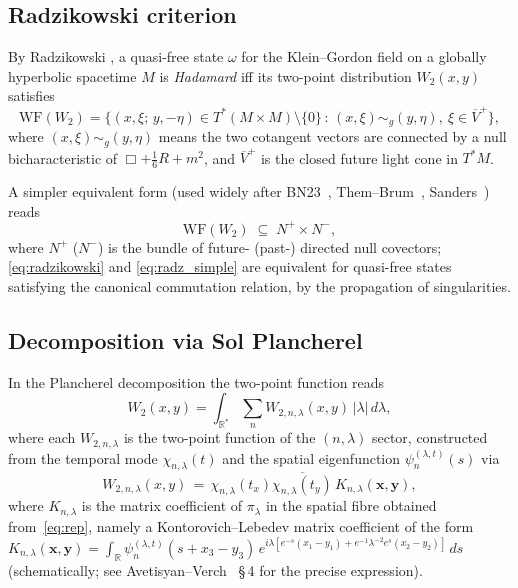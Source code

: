\documentclass[11pt,a4paper]{article}
\theoremstyle{definition}
\newcommand{\R}{\mathbb{R}}
\newcommand{\WF}{\mathrm{WF}}
\begin{document}
\subsection{Radzikowski criterion}

By Radzikowski \cite{Rad96}, a quasi-free state $\omega$ for the Klein--Gordon field
on a globally hyperbolic spacetime $M$ is \emph{Hadamard} iff its two-point
distribution $W_2(x,y)$ satisfies
\begin{equation}\label{eq:radzikowski}
  \WF(W_2) = \bigl\{(x,\xi;\,y,-\eta) \in T^*(M\times M) \setminus \{0\}\,:\,
              (x,\xi)\sim_g (y,\eta),\ \xi\in \overline{V}^{+}\bigr\},
\end{equation}
where $(x,\xi)\sim_g(y,\eta)$ means the two cotangent vectors are connected by
a null bicharacteristic of $\Box+\tfrac{1}{6}R+m^2$, and $\overline{V}^{+}$
is the closed future light cone in $T^*M$.

A simpler equivalent form (used widely after BN23~\cite{BN23},
Them--Brum~\cite{TB13}, Sanders~\cite{San10}) reads
\begin{equation}\label{eq:radz_simple}
  \WF(W_2)\;\subseteq\;N^+\times N^-,
\end{equation}
where $N^+$ ($N^-$) is the bundle of future- (past-) directed null covectors;
\eqref{eq:radzikowski} and \eqref{eq:radz_simple} are equivalent for
quasi-free states satisfying the canonical commutation relation, by the propagation
of singularities.

\subsection{Decomposition via Sol Plancherel}

In the Plancherel decomposition the two-point function reads
\begin{equation}\label{eq:W2decomp}
  W_2(x,y) = \int_{\R^*}\!\sum_n W_{2,n,\lambda}(x,y)\,|\lambda|\,d\lambda,
\end{equation}
where each $W_{2,n,\lambda}$ is the two-point function of the $(n,\lambda)$ sector,
constructed from the temporal mode $\chi_{n,\lambda}(t)$ and the spatial
eigenfunction $\psi_n^{(\lambda,t)}(s)$ via
\begin{equation}\label{eq:Wnlam}
  W_{2,n,\lambda}(x,y)\,=\,\chi_{n,\lambda}(t_x)\overline{\chi_{n,\lambda}(t_y)}\,
  K_{n,\lambda}(\boldsymbol{x},\boldsymbol{y}),
\end{equation}
where $K_{n,\lambda}$ is the matrix coefficient of $\pi_\lambda$ in the
spatial fibre obtained from~\eqref{eq:rep}, namely a Kontorovich--Lebedev
matrix coefficient of the form
$K_{n,\lambda}(\boldsymbol{x},\boldsymbol{y}) =
\int_\R \psi_n^{(\lambda,t)}(s+x_3-y_3)\,
e^{i\lambda[e^{-s}(x_1-y_1)+e^{-1}\lambda^{-2}e^{s}(x_2-y_2)]}\,ds$
(schematically; see Avetisyan--Verch~\cite{AV13} \S\,4 for the precise expression).
\end{document}
